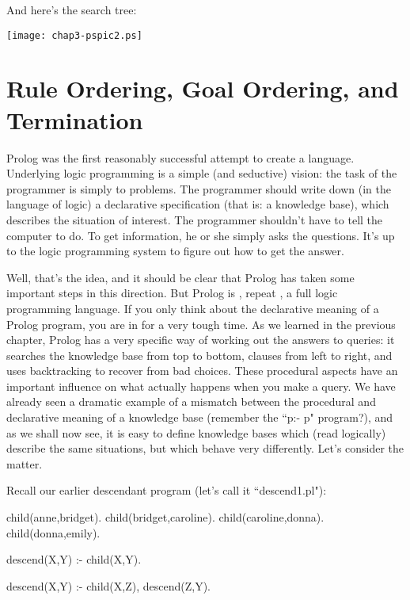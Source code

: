 And here's the search tree:

\begin{center}
\texttt{[image: chap3-pspic2.ps]}
\end{center}

\section{Rule Ordering, Goal Ordering, and Termination}\label{SEC.L3.RO.CO.TERM}



Prolog was the first reasonably successful attempt to create a
 language.  Underlying logic programming is
a simple (and seductive) vision: the task of the programmer is simply
to  problems.  The programmer should write down (in
the language of logic) a declarative specification (that is: a
knowledge base), which describes the situation of interest.  The
programmer shouldn't have to tell the computer  to do.
To get information, he or she simply asks the questions.  It's up to
the logic programming system to figure out how to get the answer.

Well, that's the idea, and it should be clear that Prolog has taken
some important steps in this direction.  But Prolog is ,
repeat , a full logic programming language.  If you only
think about the declarative meaning of a Prolog program, you are in
for a very tough time.  As we learned in the previous chapter, Prolog
has a very specific way of working out the answers to queries: it
searches the knowledge base from top to bottom, clauses from left to
right, and uses backtracking to recover from bad choices. These
procedural aspects have an important influence on what actually
happens when you make a query. We have already seen a dramatic example
of a mismatch between the procedural and declarative meaning of a
knowledge base (remember the ``p:- p" program?), and as we shall now
see, it is easy to define knowledge bases which (read logically)
describe the same situations, but which behave very differently.
Let's consider the matter.

Recall our earlier descendant program (let's call it ``descend1.pl"):
\begin{LPNcodedisplay}
child(anne,bridget).
child(bridget,caroline).
child(caroline,donna).
child(donna,emily).

descend(X,Y) :- child(X,Y).

descend(X,Y) :- child(X,Z),
                 descend(Z,Y).
\end{LPNcodedisplay}


